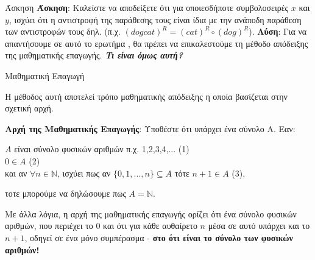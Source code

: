 \documentclass[size=14pt, paper=smartboard, style=fyma, mode=present]{powerdot}
\begin{document}
\begin{slide}[toc=]{Άσκηση}
{\large 	\textbf{Άσκηση}: Καλείστε να αποδείξετε ότι για οποιεσδήποτε συμβολοσειρές $x$ και $y$, ισχύει ότι η αντιστροφή της παράθεσης τους είναι ίδια με την ανάποδη παράθεση των αντιστροφών τους δηλ.  \unboldmath (π.χ. $(dogcat)^R = (cat)^R \circ (dog)^R$).
	\newline
	\textbf{Λύση}: Για να απαντήσουμε σε αυτό το ερωτήμα , θα πρέπει να επικαλεστούμε τη μέθοδο απόδειξης της μαθηματικής επαγωγής. \textbf{\textit{Τι είναι όμως αυτή?}}}
\end{slide}
\begin{slide}[toc={Μαθηματική Επαγωγή}]{Μαθηματική Επαγωγή}
	\begin{itemize}
{\large 		\item Η μέθοδος αυτή αποτελεί τρόπο μαθηματικής απόδειξης η οποία βασίζεται στην σχετική αρχή.
		\item \textbf{Αρχή της Μαθηματικής Επαγωγής}: Υποθέστε ότι υπάρχει ένα σύνολο Α. Εαν:
		\begin{center}
			$A$ είναι σύνολο φυσικών αριθμών π.χ. 1,2,3,4,... (1) \\
			$ 0 \in A $ (2) \\
			και αν $ \forall n \in \mathbb{N}$, ισχύει πως αν $\{0,1,...,n\} \subseteq A$ τότε $ n+1 \in Α $ (3),
		\end{center}
τοτε μπορούμε να δηλώσουμε πως $ A = \mathbb{N}$.
\newline
\item Με άλλα λόγια, η αρχή της μαθηματικής επαγωγής ορίζει ότι ένα σύνολο φυσικών αριθμών, που περιέχει το 0 και ότι για κάθε αυθαίρετο $n$ μέσα σε αυτό υπάρχει και το $n+1$, οδηγεί σε ένα μόνο συμπέρασμα - \textbf{στο ότι είναι το σύνολο των φυσικών αριθμών!}}
	\end{itemize}
\end{slide}
\end{document}
